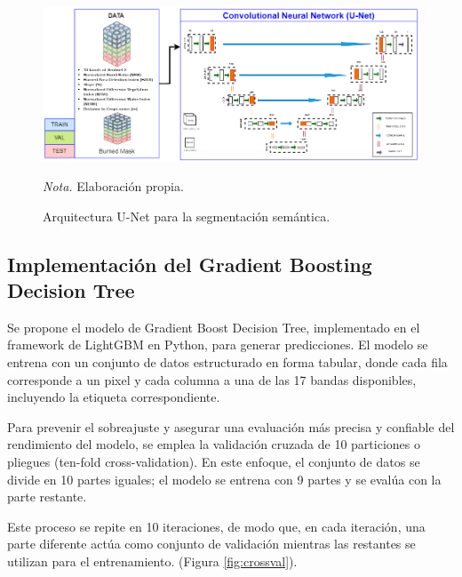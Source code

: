 \begin{figure}[H]
    \centering
    \caption{Arquitectura U-Net para la segmentación semántica.}
    \includegraphics[width=1\textwidth]{img/6_metodologia/unet.png}
    \label{fig:unet_architecture}
    \begin{flushleft}
        \vspace{-\baselineskip}
        \textit{Nota.} Elaboración propia.        
        \vspace{-\baselineskip}
    \end{flushleft}
\end{figure}

\subsection{Implementación del Gradient Boosting Decision Tree}
Se propone el modelo de Gradient Boost Decision Tree, implementado  en el framework de LightGBM en Python, para generar predicciones. El modelo se entrena con un conjunto de datos estructurado en forma tabular, donde cada fila corresponde a 
un pixel y cada columna a una de las 17 bandas disponibles, incluyendo la etiqueta correspondiente.

Para prevenir el sobreajuste y asegurar una evaluación más precisa y confiable del rendimiento del modelo, se emplea la validación cruzada de 10 particiones o pliegues (ten-fold cross-validation). En este enfoque, el conjunto de datos se divide en 
10 partes iguales; el modelo se entrena con 9 partes y se evalúa con la parte restante. 

Este proceso se repite en 10 iteraciones, de modo que, en cada iteración, una parte diferente actúa como conjunto de validación mientras las restantes se utilizan 
para el entrenamiento. (Figura \ref{fig:crossval}).

